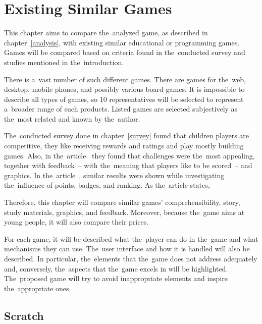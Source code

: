 \chapter{Existing Similar Games}
\label{competitive-games}

This chapter aims to compare the~analyzed game, as described in chapter~\ref{analysis}, with existing similar educational or programming games.
Games will be compared based on criteria found in the~conducted survey and studies mentioned in the~introduction.

There is a~vast number of such different games.
There are games for the~web, desktop, mobile phones, and possibly various board games.
It is impossible to describe all types of games, so 10 representatives will be selected to represent a~broader range of such products.
Listed games are selected subjectively as the~most related and known by the~author.

The~conducted survey done in chapter~\ref{survey} found that children players are competitive, they like receiving rewards and ratings and play mostly building games.
Also, in the~article~\cite{nand_2019_engaging} they found that challenges were the~most appealing, together with feedback~-- with the~meaning that players like to be scored~-- and graphics.
In the~article~\cite{smiderle_2020_the}, similar results were shown while investigating the~influence of points, badges, and ranking.
As the~article states, 

Therefore, this chapter will compare similar games' comprehensibility, story, study materials, graphics, and feedback.
Moreover, because the~game \emph{\myAppName} aims at young people, it will also compare their prices.

For each game, it will be described what the~player can do in the~game and what mechanisms they can use.
The~user interface and how it is handled will also be described.
In particular, the~elements that the~game does not address adequately and, conversely, the~aspects that the~game excels in will be highlighted.
The~proposed game will try to avoid inappropriate elements and inspire the~appropriate ones.

\pagebreak
\section{Scratch}
\label{similar-games:scratch}

